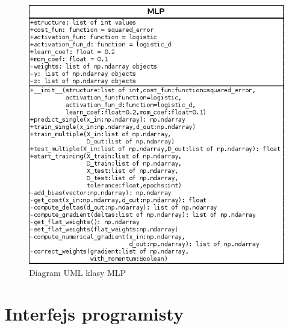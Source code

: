 \begin{figure}
\includegraphics[width=\textwidth]{mlp01.png}
\caption{Diagram UML klasy MLP}
\label{fig:mlp01}
\end{figure}

\pagebreak

\section{Interfejs programisty}
\label{Sec:MLPAPI}


